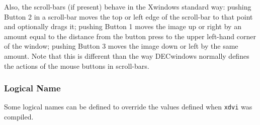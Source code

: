 Also, the scroll-bars (if present) behave in the Xwindows standard way:  pushing
Button 2 in a scroll-bar moves the top or left edge of the scroll-bar to that
point and optionally drags it; pushing Button 1 moves the image up or right by
an amount equal to the distance from the button press to the upper left-hand
corner of the window; pushing Button 3 moves the image down or left by the same
amount. Note that this is different than the way DECwindows normally defines
the actions of the mouse buttons in scroll-bars.


\subsubsection{Logical Name}
\label{se:dvixdvilognames}

Some logical names can be defined to override the values defined when
\verb+xdvi+ was compiled.

